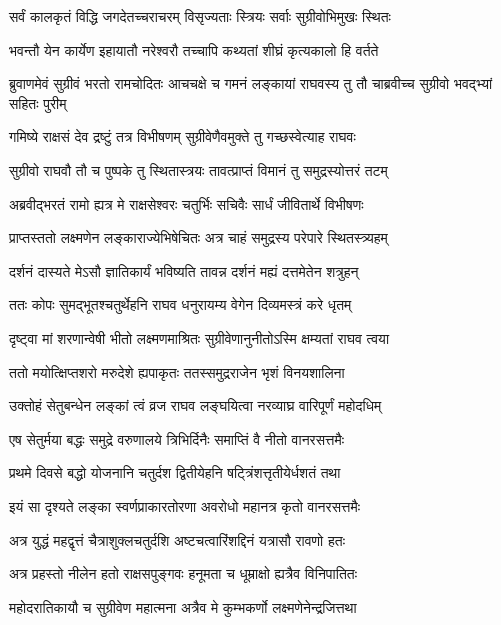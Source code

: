 \twolineshloka
{सर्वं कालकृतं विद्धि जगदेतच्चराचरम्}
{विसृज्यताः स्त्रियः सर्वाः सुग्रीवोभिमुखः स्थितः}%


\twolineshloka
{भवन्तौ येन कार्येण इहायातौ नरेश्वरौ}
{तच्चापि कथ्यतां शीघ्रं कृत्यकालो हि वर्तते}%


\threelineshloka
{ब्रुवाणमेवं सुग्रीवं भरतो रामचोदितः}
{आचचक्षे च गमनं लङ्कायां राघवस्य तु}
{तौ चाब्रवीच्च सुग्रीवो भवद्भ्यां सहितः पुरीम्}%

\twolineshloka
{गमिष्ये राक्षसं देव द्रष्टुं तत्र विभीषणम्}
{सुग्रीवेणैवमुक्ते तु गच्छस्वेत्याह राघवः}%

\twolineshloka
{सुग्रीवो राघवौ तौ च पुष्पके तु स्थितास्त्रयः}
{तावत्प्राप्तं विमानं तु समुद्रस्योत्तरं तटम्}%

\twolineshloka
{अब्रवीद्भरतं रामो ह्यत्र मे राक्षसेश्वरः}
{चतुर्भिः सचिवैः सार्धं जीवितार्थे विभीषणः}%

\twolineshloka
{प्राप्तस्ततो लक्ष्मणेन लङ्काराज्येभिषेचितः}
{अत्र चाहं समुद्रस्य परेपारे स्थितस्त्र्यहम्}%

\twolineshloka
{दर्शनं दास्यते मेऽसौ ज्ञातिकार्यं भविष्यति}
{तावन्न दर्शनं मह्यं दत्तमेतेन शत्रुहन्}%

\twolineshloka
{ततः कोपः सुमद्भूतश्चतुर्थेहनि राघव}
{धनुरायम्य वेगेन दिव्यमस्त्रं करे धृतम्}%

\twolineshloka
{दृष्ट्वा मां शरणान्वेषी भीतो लक्ष्मणमाश्रितः}
{सुग्रीवेणानुनीतोऽस्मि क्षम्यतां राघव त्वया}%

\twolineshloka
{ततो मयोत्क्षिप्तशरो मरुदेशे ह्यपाकृतः}
{ततस्समुद्रराजेन भृशं विनयशालिना}%

\twolineshloka
{उक्तोहं सेतुबन्धेन लङ्कां त्वं व्रज राघव}
{लङ्घयित्वा नरव्याघ्र वारिपूर्णं महोदधिम्}%

\twolineshloka
{एष सेतुर्मया बद्धः समुद्रे वरुणालये}
{त्रिभिर्दिनैः समाप्तिं वै नीतो वानरसत्तमैः}%

\twolineshloka
{प्रथमे दिवसे बद्धो योजनानि चतुर्दश}
{द्वितीयेहनि षट्त्रिंशत्तृतीयेर्धशतं तथा}%

\twolineshloka
{इयं सा दृश्यते लङ्का स्वर्णप्राकारतोरणा}
{अवरोधो महानत्र कृतो वानरसत्तमैः}%

\twolineshloka
{अत्र युद्धं महद्वृत्तं चैत्राशुक्लचतुर्दशि}
{अष्टचत्वारिंशद्दिनं यत्रासौ रावणो हतः}%

\twolineshloka
{अत्र प्रहस्तो नीलेन हतो राक्षसपुङ्गवः}
{हनूमता च धूम्राक्षो ह्यत्रैव विनिपातितः}%

\twolineshloka
{महोदरातिकायौ च सुग्रीवेण महात्मना}
{अत्रैव मे कुम्भकर्णो लक्ष्मणेनेन्द्रजित्तथा}%


